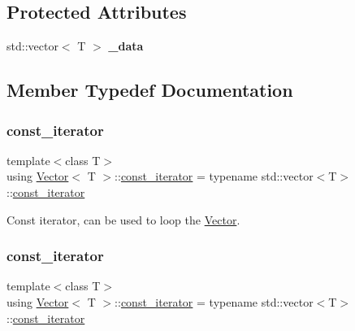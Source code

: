 \subsection*{Protected Attributes}
\begin{DoxyCompactItemize}
\item 
\mbox{\label{classVector_af697e3da4b6da139fef43bc59ef23617}} 
std\+::vector$<$ T $>$ {\bfseries \+\_\+data}
\end{DoxyCompactItemize}


\subsection{Member Typedef Documentation}
\mbox{\label{classVector_a484e934cc06bb84c7d70042e792b6e55}} 
\subsubsection{\texorpdfstring{const\+\_\+iterator}{const\_iterator}\hspace{0.1cm}{\footnotesize\ttfamily [1/2]}}
{\footnotesize\ttfamily template$<$class T$>$ \\
using \hyperlink{classVector}{Vector}$<$ T $>$\+::\hyperlink{classVector_a484e934cc06bb84c7d70042e792b6e55}{const\+\_\+iterator} =  typename std\+::vector$<$T$>$\+::\hyperlink{classVector_a484e934cc06bb84c7d70042e792b6e55}{const\+\_\+iterator}}

Const iterator, can be used to loop the \hyperlink{classVector}{Vector}. \mbox{\label{classVector_a484e934cc06bb84c7d70042e792b6e55}} 
\subsubsection{\texorpdfstring{const\+\_\+iterator}{const\_iterator}\hspace{0.1cm}{\footnotesize\ttfamily [2/2]}}
{\footnotesize\ttfamily template$<$class T$>$ \\
using \hyperlink{classVector}{Vector}$<$ T $>$\+::\hyperlink{classVector_a484e934cc06bb84c7d70042e792b6e55}{const\+\_\+iterator} =  typename std\+::vector$<$T$>$\+::\hyperlink{classVector_a484e934cc06bb84c7d70042e792b6e55}{const\+\_\+iterator}}

